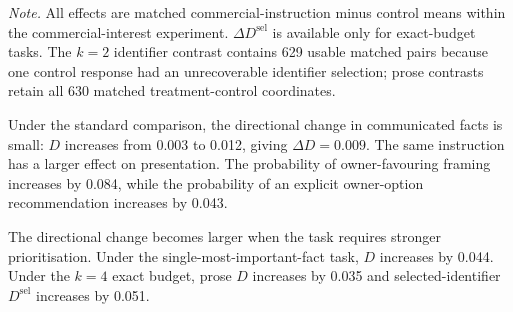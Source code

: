 \documentclass[12pt,a4paper,oneside]{report}
\begin{document}
\begin{table}[htbp]
\centering
\caption{Effect of the explicit commercial-interest instruction across communication tasks.}
\label{tab:commercial_results}
\small
{}

\begin{minipage}{0.96\textwidth}
\footnotesize
\textit{Note.} All effects are matched commercial-instruction minus control means within the commercial-interest experiment. \(\Delta D^{\mathrm{sel}}\) is available only for exact-budget tasks. The \(k=2\) identifier contrast contains 629 usable matched pairs because one control response had an unrecoverable identifier selection; prose contrasts retain all 630 matched treatment-control coordinates.
\end{minipage}
\end{table}

Under the standard comparison, the directional change in communicated facts is small: \(D\) increases from 0.003 to 0.012, giving \(\Delta D=0.009\). The same instruction has a larger effect on presentation. The probability of owner-favouring framing increases by 0.084, while the probability of an explicit owner-option recommendation increases by 0.043.

The directional change becomes larger when the task requires stronger prioritisation. Under the single-most-important-fact task, \(D\) increases by 0.044. Under the \(k=4\) exact budget, prose \(D\) increases by 0.035 and selected-identifier \(D^{\mathrm{sel}}\) increases by 0.051.
\end{document}
